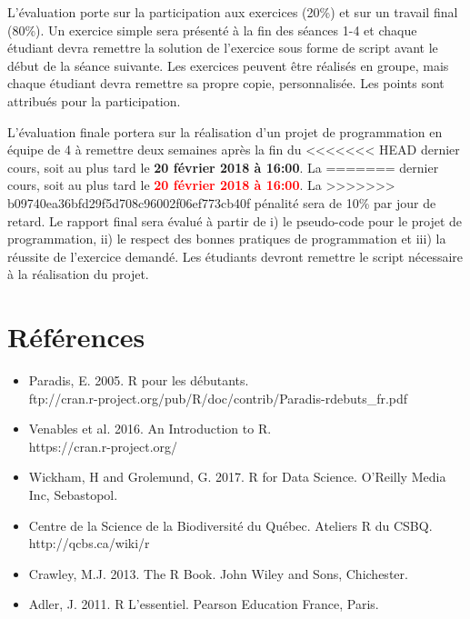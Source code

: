 \documentclass[12]{article}
\begin{document}
	L'évaluation porte sur la participation aux exercices (20\%) et sur un
	travail final (80\%). Un exercice simple sera présenté à la fin des
	séances 1-4 et chaque étudiant devra remettre la solution de l'exercice sous
	forme de script avant le début de la séance suivante. Les exercices
	peuvent être réalisés en groupe, mais chaque étudiant devra remettre sa
	propre copie, personnalisée. Les points sont attribués pour la
	participation.

	L'évaluation finale portera sur la réalisation d'un projet de
	programmation en équipe de 4 à remettre deux semaines après la fin du
<<<<<<< HEAD
	dernier cours, soit au plus tard le \textbf{20 février 2018 à 16:00}. La
=======
	dernier cours, soit au plus tard le \textcolor{red}{\textbf{20 février 2018 à 16:00}}. La
>>>>>>> b09740ea36bfd29f5d708c96002f06ef773cb40f
	pénalité sera de 10\% par jour de retard. Le rapport final sera évalué à
	partir de i) le pseudo-code pour le projet de programmation, ii) le respect
	des bonnes pratiques de programmation et iii) la réussite de l'exercice
	demandé. Les étudiants devront remettre le script nécessaire à la
	réalisation du projet.

	\section*{Références}

	\begin{itemize}
	\renewcommand{\labelitemi}{$\bullet$}

		\item Paradis, E. 2005. R pour les débutants.
		\\ ftp://cran.r-project.org/pub/R/doc/contrib/Paradis-rdebuts\_fr.pdf

		\item Venables et al. 2016. An Introduction to R.
		\\ https://cran.r-project.org/

		\item Wickham, H and Grolemund, G. 2017. R for Data Science. O'Reilly Media Inc, Sebastopol.

		\item Centre de la Science de la Biodiversité du Québec. Ateliers R du CSBQ. \\ http://qcbs.ca/wiki/r

		\item Crawley, M.J. 2013. The R Book. John Wiley and Sons, Chichester.

		\item Adler, J. 2011. R L'essentiel. Pearson Education France, Paris.

	\end{itemize}
\end{document}
